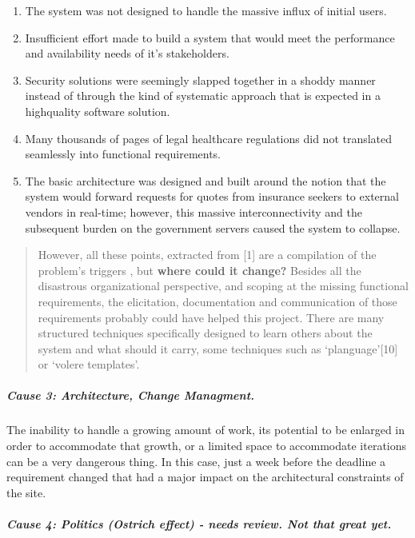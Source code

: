 \documentclass[]{article}
\providecommand{\tightlist}{%
  \setlength{\itemsep}{0pt}\setlength{\parskip}{0pt}}
\let\oldsubparagraph\subparagraph
\renewcommand{\subparagraph}[1]{\oldsubparagraph{#1}\mbox{}}
\begin{document}
\begin{enumerate}
\def\labelenumi{\arabic{enumi}.}
\tightlist
\item
  The system was not designed to handle the massive influx of initial
  users.
\item
  Insufficient effort made to build a system that would meet the
  performance and availability needs of it's stakeholders.
\item
  Security solutions were seemingly slapped together in a shoddy manner
  instead of through the kind of systematic approach that is expected in
  a highquality software solution.
\item
  Many thousands of pages of legal healthcare regulations did not
  translated seamlessly into functional requirements.
\item
  The basic architecture was designed and built around the notion that
  the system would forward requests for quotes from insurance seekers to
  external vendors in real-time; however, this massive interconnectivity
  and the subsequent burden on the government servers caused the system
  to collapse.
\end{enumerate}

\begin{quote}
However, all these points, extracted from {[}1{]} are a compilation of
the problem's triggers , but \textbf{where could it change?} Besides all
the disastrous organizational perspective, and scoping at the missing
functional requirements, the elicitation, documentation and
communication of those requirements probably could have helped this
project. There are many structured techniques specifically designed to
learn others about the system and what should it carry, some techniques
such as `planguage'{[}10{]} or `volere templates'.
\end{quote}

\subparagraph{Cause 3: Architecture, Change
Managment.}\label{cause-3-architecture-change-managment.}

The inability to handle a growing amount of work, its potential to be
enlarged in order to accommodate that growth, or a limited space to
accommodate iterations can be a very dangerous thing. In this case, just
a week before the deadline a requirement changed that had a major impact
on the architectural constraints of the site.

\subparagraph{Cause 4: Politics (Ostrich effect) - needs review. Not
that great
yet.}\label{cause-4-politics-ostrich-effect---needs-review.-not-that-great-yet.}
\end{document}
